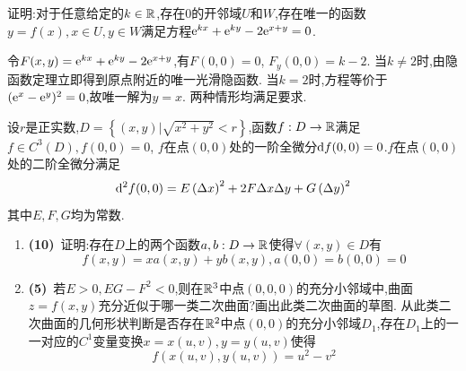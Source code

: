\documentclass{ctexart}
\begin{document}
\begin{problem}[8.(10\songti{分})]
证明:对于任意给定的$k\in\mathbb{R}$,存在$0$的开邻域$U$和$W$,存在唯一的函数$y=f(x),x\in U,y\in W$满足方程$\mathrm{e}^{kx}+\mathrm{e}^{ky}-2\mathrm{e}^{x+y}=0$.
\end{problem}
\begin{solution}
令$F(x,y)=\mathrm{e}^{kx}+\mathrm{e}^{ky}-2\mathrm{e}^{x+y}$,有$F(0,0)=0$, $F_y(0,0)=k-2$.
当$k\neq2$时,由隐函数定理立即得到原点附近的唯一光滑隐函数.
当$k=2$时,方程等价于$(\mathrm{e}^x-\mathrm{e}^y)^2=0$,故唯一解为$y=x$.
两种情形均满足要求.
\end{solution}
\begin{problem}[9.(15\songti{分})]
设$r$是正实数,$D=\left\{(x,y)\vert\sqrt{x^2+y^2}<r\right\}$,函数$f:D\to\mathbb{R}$满足$f\in C^3(D),f(0,0)=0$,
        $f$在点$(0,0)$处的一阶全微分$\mathrm{d} f(0,0)=0$.$f$在点$(0,0)$处的二阶全微分满足
        $$\mathrm{d}^2f(0,0)=E\left(\Delta x\right)^2+2F\Delta x\Delta y+G\left(\Delta y\right)^2$$
        其中$E,F,G$均为常数.
        \begin{enumerate}[label=\textbf{(\arabic*)},leftmargin=*]
            \item \textbf{(10)}\ 证明:存在$D$上的两个函数$a,b:D\to\mathbb{R}$使得$\forall (x,y)\in D$有$$f(x,y)=xa(x,y)+yb(x,y),a(0,0)=b(0,0)=0$$
            \item \textbf{(5)}\ 若$E>0,EG-F^2<0$,则在$\mathbb{R}^3$中点$(0,0,0)$的充分小邻域中,曲面$z=f(x,y)$充分近似于哪一类二次曲面?画出此类二次曲面的草图.
                从此类二次曲面的几何形状判断是否存在$\mathbb{R}^2$中点$(0,0)$的充分小邻域$D_1$,存在$D_1$上的一一对应的$C^1$变量变换$x=x(u,v),y=y(u,v)$使得
                $$f(x(u,v),y(u,v))=u^2-v^2$$
        \end{enumerate}
\end{problem}
\end{document}
